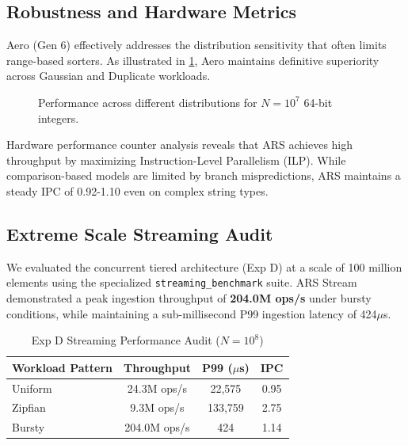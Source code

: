 \subsection{Robustness and Hardware Metrics}
Aero (Gen 6) effectively addresses the distribution sensitivity that often limits range-based sorters. As illustrated in \cref{fig:distributions}, Aero maintains definitive superiority across Gaussian and Duplicate workloads.

\begin{figure}[htbp]
\centering
{}
\caption{Performance across different distributions for $N=10^7$ 64-bit integers.}
\label{fig:distributions}
\end{figure}

Hardware performance counter analysis reveals that ARS achieves high throughput by maximizing Instruction-Level Parallelism (ILP). While comparison-based models are limited by branch mispredictions, ARS maintains a steady IPC of 0.92-1.10 even on complex string types.

\subsection{Extreme Scale Streaming Audit}
We evaluated the concurrent tiered architecture (Exp D) at a scale of 100 million elements using the specialized \texttt{streaming\_benchmark} suite. ARS Stream demonstrated a peak ingestion throughput of \textbf{204.0M ops/s} under bursty conditions, while maintaining a sub-millisecond P99 ingestion latency of 424$\mu$s.

\begin{table}[h]
\caption{Exp D Streaming Performance Audit ($N=10^8$)}
\label{tab:streaming_audit}
\centering
\begin{tabular}{lccc}
\toprule
Workload Pattern & Throughput & P99 ($\mu$s) & IPC \\
\midrule
Uniform & 24.3M ops/s & 22,575 & 0.95 \\
Zipfian & 9.3M ops/s & 133,759 & 2.75 \\
Bursty & 204.0M ops/s & 424 & 1.14 \\
\bottomrule
\end{tabular}
\end{table}

